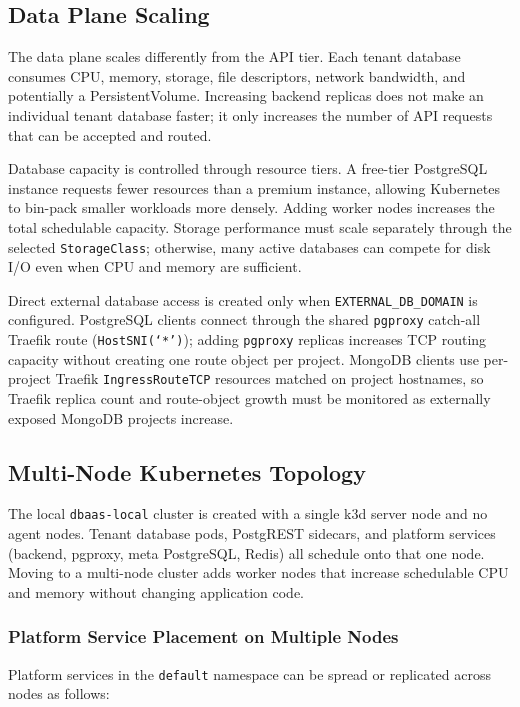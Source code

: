 \subsection{Data Plane Scaling}

The data plane scales differently from the API tier. Each tenant database consumes CPU, memory, storage, file descriptors, network bandwidth, and potentially a PersistentVolume. Increasing backend replicas does not make an individual tenant database faster; it only increases the number of API requests that can be accepted and routed.

Database capacity is controlled through resource tiers. A free-tier PostgreSQL instance requests fewer resources than a premium instance, allowing Kubernetes to bin-pack smaller workloads more densely. Adding worker nodes increases the total schedulable capacity. Storage performance must scale separately through the selected \texttt{StorageClass}; otherwise, many active databases can compete for disk I/O even when CPU and memory are sufficient.

Direct external database access is created only when \texttt{EXTERNAL\_DB\_DOMAIN} is configured. PostgreSQL clients connect through the shared \texttt{pgproxy} catch-all Traefik route (\texttt{HostSNI(`*')}); adding \texttt{pgproxy} replicas increases TCP routing capacity without creating one route object per project. MongoDB clients use per-project Traefik \texttt{IngressRouteTCP} resources matched on project hostnames, so Traefik replica count and route-object growth must be monitored as externally exposed MongoDB projects increase.

\subsection{Multi-Node Kubernetes Topology}

The local \texttt{dbaas-local} cluster is created with a single k3d server node and no agent nodes. Tenant database pods, PostgREST sidecars, and platform services (backend, pgproxy, meta PostgreSQL, Redis) all schedule onto that one node. Moving to a multi-node cluster adds worker nodes that increase schedulable CPU and memory without changing application code.

\subsubsection{Platform Service Placement on Multiple Nodes}

Platform services in the \texttt{default} namespace can be spread or replicated across nodes as follows:

